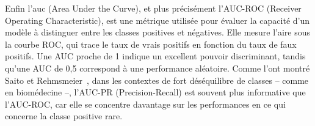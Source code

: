 \documentclass[12pt]{report}
\begin{document}
Enfin l'\gls{auc} (Area Under the Curve), et plus précisément l’AUC-ROC (Receiver Operating Characteristic), est une métrique utilisée pour évaluer la capacité d’un modèle à distinguer entre les classes positives et négatives. Elle mesure l’aire sous la courbe ROC, qui trace le taux de vrais positifs en fonction du taux de faux positifs. Une AUC proche de 1 indique un excellent pouvoir discriminant, tandis qu’une AUC de 0{,}5 correspond à une performance aléatoire. Comme l’ont montré Saito et Rehmsmeier~\cite{saito2015precision}, dans les contextes de fort déséquilibre de classes – comme en biomédecine –, l’AUC-PR (Precision-Recall) est souvent plus informative que l’AUC-ROC, car elle se concentre davantage sur les performances en ce qui concerne la classe positive rare.
\end{document}
